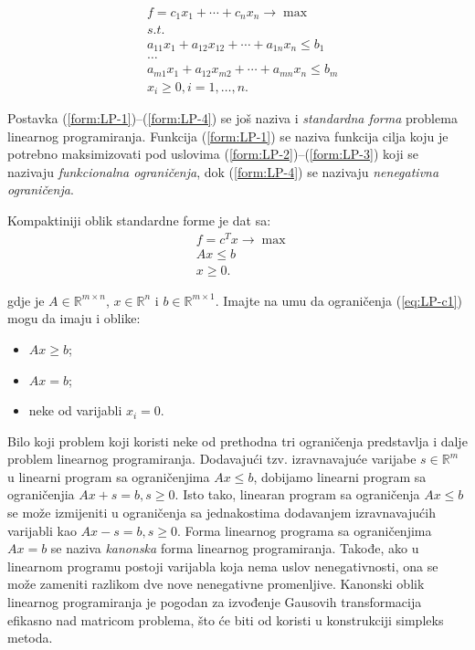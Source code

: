 \documentclass[a4paper, utf8, 11pt, colorlinks]{article}
\begin{document}
\begin{align} 
      &f = c_1 x_1 + \cdots + c_n x_n \rightarrow \max \label{form:LP-1}\\
      & s.t. \nonumber \\
      & a_{11}x_1 + a_{12} x_{12} + \cdots + a_{1n}x_n \leq b_1 \label{form:LP-2} \\
      &\ldots \nonumber \\
      & a_{m1}x_1 + a_{12} x_{m2} + \cdots + a_{mn}x_n \leq b_m \label{form:LP-3} \\
      & x_i \geq 0, i=1,\ldots,n.\label{form:LP-4}
\end{align}

Postavka (\ref{form:LP-1})--(\ref{form:LP-4}) se još naziva i \emph{standardna forma} problema linearnog programiranja. Funkcija (\ref{form:LP-1}) se naziva funkcija cilja koju je potrebno maksimizovati pod uslovima (\ref{form:LP-2})--(\ref{form:LP-3}) koji se nazivaju \emph{funkcionalna ograničenja}, dok (\ref{form:LP-4}) se nazivaju \emph{nenegativna ograničenja}. 

Kompaktiniji oblik standardne forme je dat sa:
\begin{align}
    & f = c^T x \rightarrow \max \label{eq:LP-o1}\\
    &  A x \leq b \label{eq:LP-c1} \\
    & x \geq 0 \label{eq:LP-c2}.
\end{align}

gdje je $A \in \mathbb{R}^{m \times n}$, $x \in \mathbb{R}^n$ i $b \in \mathbb{R}^{m \times 1}$. Imajte na umu da ograničenja (\ref{eq:LP-c1}) mogu da imaju i oblike:
\begin{itemize}
    \item $Ax \geq b$;
    \item $Ax = b$;
    \item neke od varijabli $x_i=0$.
\end{itemize}
Bilo koji problem koji koristi neke od prethodna tri ograničenja predstavlja i dalje problem linearnog programiranja. Dodavajući tzv. izravnavajuće varijabe $s \in \mathbb{R}^m$ u linearni program sa ograničenjima $Ax \leq b$, dobijamo linearni program sa ograničenjia $Ax + s = b, s \geq 0$. Isto tako, linearan program sa ograničenja $Ax \leq b$ se može izmijeniti u ograničenja sa jednakostima dodavanjem izravnavajućih varijabli kao $Ax - s = b, s\geq 0$. Forma linearnog programa sa ograničenjima $Ax = b$ se naziva \emph{kanonska} forma linearnog programiranja.   Takođe, ako u linearnom
programu postoji varijabla koja nema uslov nenegativnosti, ona se može zameniti razlikom dve nove nenegativne promenljive. Kanonski oblik linearnog programiranja je pogodan za izvođenje Gausovih transformacija efikasno nad matricom problema, što će biti od koristi u konstrukciji simpleks metoda.   %
\end{document}
